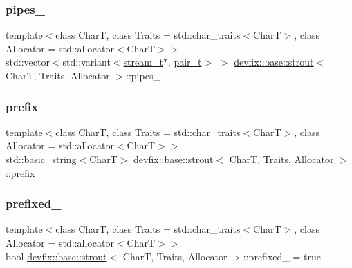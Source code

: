 \subsubsection{\texorpdfstring{pipes\+\_\+}{pipes\_}}
{\footnotesize\ttfamily template$<$class CharT, class Traits = std\+::char\+\_\+traits$<$\+Char\+T$>$, class Allocator = std\+::allocator$<$\+Char\+T$>$$>$ \\
std\+::vector$<$std\+::variant$<$\hyperlink{structdevfix_1_1base_1_1strout_a158aadfad348eeac7c56a8b43699a4d3}{stream\+\_\+t}$\ast$, \hyperlink{structdevfix_1_1base_1_1strout_a2212cb8a99abec10490e891cc67820bb}{pair\+\_\+t}$>$ $>$ \hyperlink{structdevfix_1_1base_1_1strout}{devfix\+::base\+::strout}$<$ CharT, Traits, Allocator $>$\+::pipes\+\_\+\hspace{0.3cm}{\ttfamily [protected]}}

\mbox{\label{structdevfix_1_1base_1_1strout_a664c76563ab0f7f0625779aaf0c56395}} 
\subsubsection{\texorpdfstring{prefix\+\_\+}{prefix\_}}
{\footnotesize\ttfamily template$<$class CharT, class Traits = std\+::char\+\_\+traits$<$\+Char\+T$>$, class Allocator = std\+::allocator$<$\+Char\+T$>$$>$ \\
std\+::basic\+\_\+string$<$CharT$>$ \hyperlink{structdevfix_1_1base_1_1strout}{devfix\+::base\+::strout}$<$ CharT, Traits, Allocator $>$\+::prefix\+\_\+\hspace{0.3cm}{\ttfamily [protected]}}

\mbox{\label{structdevfix_1_1base_1_1strout_a1e56005b02772de34fddd5e4f44741c3}} 
\subsubsection{\texorpdfstring{prefixed\+\_\+}{prefixed\_}}
{\footnotesize\ttfamily template$<$class CharT, class Traits = std\+::char\+\_\+traits$<$\+Char\+T$>$, class Allocator = std\+::allocator$<$\+Char\+T$>$$>$ \\
bool \hyperlink{structdevfix_1_1base_1_1strout}{devfix\+::base\+::strout}$<$ CharT, Traits, Allocator $>$\+::prefixed\+\_\+ = true\hspace{0.3cm}{\ttfamily [protected]}}


